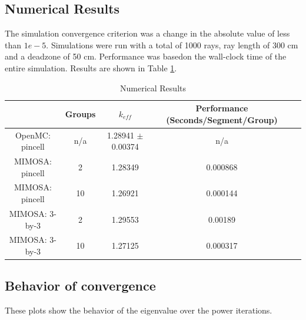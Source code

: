 \documentclass[10pt,letter]{article}
\begin{document}
\subsection{Numerical Results}
The simulation convergence criterion was a change in the absolute value of less than $1e-5$. Simulations were run with a total of 1000 rays, ray length of 300 cm and a deadzone of 50 cm. Performance was basedon the wall-clock time of the entire simulation. Results are shown in Table \ref{tab:results}.

\begin{table}[h]
\begin{center}
\caption{Numerical Results} \label{tab:results}
\begin{tabular}{ |c|c|c|c|c| } 
\hline
& Groups & $k_{eff}$ & Performance (Seconds/Segment/Group)\\ 
\hline
OpenMC: pincell & n/a &  1.28941 $\pm$  0.00374  & n/a \\
\hline
MIMOSA: pincell & 2 & 1.28349 & 0.000868\\
\hline
MIMOSA: pincell & 10 & 1.26921 & 0.000144 \\
\hline
MIMOSA: 3-by-3 & 2 &  1.29553 & 0.00189\\
\hline
MIMOSA: 3-by-3 & 10 & 1.27125 & 0.000317\\
\hline
\end{tabular}
\end{center}
\end{table}

\subsection{Behavior of convergence} 
These plots show the behavior of the eigenvalue over the power iterations. 
\end{document}
